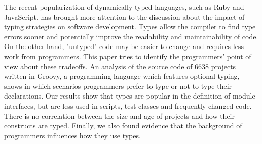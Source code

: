 The recent popularization of dynamically typed languages, such as Ruby and JavaScript, has brought more attention to the discussion about the impact of typing strategies on software development.
Types allow the compiler to find type errors sooner and potentially improve the readability and maintainability of code.
On the other hand, "untyped" code may be easier to change and requires less work from programmers.
This paper tries to identify the programmers' point of view about these tradeoffs.
An analysis of the source code of 6638 projects written in Groovy, a programming language which features optional typing, shows in which scenarios programmers prefer to type or not to type their declarations. 
Our results show that types are popular in the definition of module interfaces, but are less used in scripts, test classes and frequently changed code.
There is no correlation between the size and age of projects and how their constructs are typed.
Finally, we also found evidence that the background of programmers influences how they use types.

